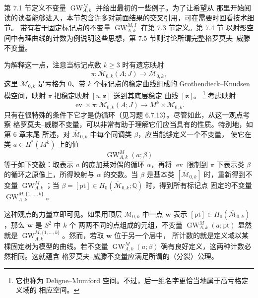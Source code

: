 第 7.1 节定义不变量 $\operatorname{GW}_{A,k}^M$ 并给出最初的一些例子。为了让希望从
那里开始阅读的读者能够进入，本节包含许多对前面结果的交叉引用，可在需要时回看技术细节。
带有若干固定标记点的不变量 $\operatorname{GW}_{A,k}^{M,I}$ 在第 7.3 节定义。第 7.4 节
以射影空间中有理曲线的计数为例说明这些思想，第 7.5 节则讨论所谓完整格罗莫夫--威滕不变量。

为解释这一点，注意当标记点数 $k\ge3$ 时有遗忘映射
\[
  \pi:\overline{\mathcal M}_{0,k}(A;J)
  \longrightarrow\overline{\mathcal M}_{0,k},
\]
这里 $\overline{\mathcal M}_{0,k}$ 是亏格为 $0$、带 $k$ 个标记点的稳定曲线组成的
Grothendieck--Knudsen 模空间，映射 $\pi$ 把稳定映射 $[u,\mathbf z]$ 送到其底层稳定
曲线 $[\mathbf z]$。
\footnote{它也称为 Deligne--Mumford 空间。不过，后一组名字更恰当地属于高亏格定义域的
相应空间。}
考虑映射
\[
  \operatorname{ev}\times\pi:
  \overline{\mathcal M}_{0,k}(A;J)
  \longrightarrow M^k\times\overline{\mathcal M}_{0,k}.
\]
只有在很特殊的条件下它才是伪循环（见习题 6.7.13）。尽管如此，从这一观点考察
格罗莫夫--威滕不变量，可以非常有助于理解它们应当具有的性质。特别地，如第 6 章末尾
所述，对 $\overline{\mathcal M}_{0,k}$ 中每个同调类 $\beta$，应当能够定义一个不变量，
使它在类 $a\in H^*(M^k)$ 上的值
\[
  \operatorname{GW}_{A,k}^M(a;\beta)
\]
等于如下交数：取表示 $a$ 的庞加莱对偶的循环 $\alpha$，再将
$\operatorname{ev}$ 限制到 $\pi$ 下表示类 $\beta$ 的循环之原像上，所得映射与 $\alpha$
的交数。当 $\beta$ 是基本类 $[\overline{\mathcal M}_{0,k}]$ 时，重新得到不变量
$\operatorname{GW}_{A,k}^M$；当
$\beta=[\mathrm{pt}]\in H_0(\overline{\mathcal M}_{0,k};\mathbb Q)$ 时，得到所有标记点
固定的不变量 $\operatorname{GW}_{A,k}^{M,\{1,\dots,k\}}$。

这种观点的力量立即可见。如果用顶层 $\mathcal M_{0,k}$ 中一点 $\mathbf w$ 表示
$[\mathrm{pt}]\in H_0(\overline{\mathcal M}_{0,k})$，那么 $\mathbf w$ 是 $S^2$ 中 $k$ 个
两两不同的点组成的元组，不变量 $\operatorname{GW}_{A,k}^M(a;\mathrm{pt})$ 显然就是
$\operatorname{GW}_{A,k}^{M,\{1,\dots,k\}}$。然而，若取 $\mathbf w$ 位于另一个层中，
所计数的就是定义域以某棵固定树为模型的曲线。若不变量
$\operatorname{GW}_{A,k}^M(a;\beta)$ 确有良好定义，这两种计数必然相同。这就蕴含
格罗莫夫--威滕不变量应满足所谓的（分裂）公理。

